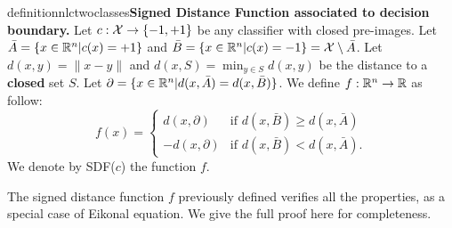     \begin{restatable}{definition}{nlctwoclasses}{\normalfont \textbf{Signed Distance Function associated to decision boundary.}}\label{def:nlctwoclasses}
        Let $c:\mathcal{X}\rightarrow\{-1,+1\}$ be any classifier with closed pre-images. Let $\bar{A}=\{x\in\mathbb{R}^n|c(x)=+1\}$ and $\bar{B}=\{x\in\mathbb{R}^n|c(x)=-1\}=\mathcal{X}\setminus \bar{A}$. Let $d(x,y)=\|x-y\|$ and $d(x,S)=\min_{y\in S}d(x,y)$ be the distance to a \textbf{closed} set $S$. Let $\partial=\{x\in\mathbb{R}^n|d(x,\bar{A})=d(x,\bar{B})\}$.    
        We define $f:\mathbb{R}^n\rightarrow\mathbb{R}$ as follow:
        \begin{equation}
            f(x)=\begin{cases}
                d(x,\partial)& \text{if } d(x,\bar{B}) \geq d(x,\bar{A})\\
                -d(x,\partial)& \text{if } d(x,\bar{B}) < d(x,\bar{A}).
            \end{cases}
        \end{equation}
        We denote by SDF($c$) the function $f$.  
    \end{restatable}
    The signed distance function $f$ previously defined verifies all the properties, as a special case of Eikonal equation. We give the full proof here for completeness.  
